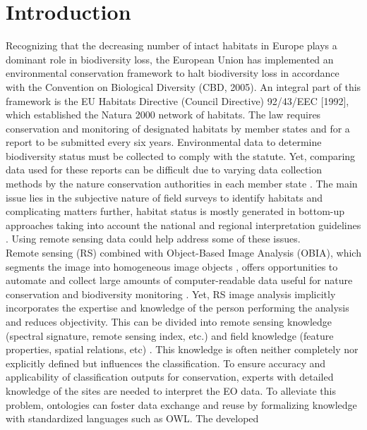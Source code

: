 \documentclass[authoryear, review,12pt,number]{elsarticle}
\begin{document}
\section{Introduction}  %
Recognizing that the decreasing number of
intact habitats in Europe  plays a dominant role in biodiversity loss, the
European Union has implemented an environmental conservation framework to halt
biodiversity loss in accordance with the Convention on Biological Diversity
(CBD, 2005). An integral part of this framework is the EU Habitats Directive
(Council Directive) 92/43/EEC [1992], which established the Natura 2000 network
of habitats. The law requires conservation and monitoring of designated habitats
by member states and for a report to be submitted every six years.
Environmental data to determine biodiversity status must be collected to comply
with the statute. Yet, comparing data used for these reports can be
difficult due to varying data collection methods by the nature conservation
authorities in each member state \citep{INSPIREdataspecs, INSPIRE}.
The main issue lies in the subjective nature of field surveys to identify
habitats \citep{Cherrill1999, Cherrill1999a, Nieland2015} and  %
complicating matters further, habitat status is mostly generated in
bottom-up approaches taking into account the national and regional
interpretation guidelines \citep{INSPIREdataspecs}. Using remote sensing
data could help address some of these issues.
\\
Remote sensing (RS) combined with Object-Based Image Analysis (OBIA), which
segments the image into homogeneous image objects \citep{Blaschke2010}, offers
opportunities to automate and collect large amounts of computer-readable data
useful for nature conservation and biodiversity monitoring \citep{Corbane2015,
VandenBorre2011, Mayer2011}. Yet, RS image analysis implicitly incorporates the
expertise and knowledge of the person performing the analysis and reduces
objectivity. This can be divided into remote sensing knowledge (spectral
signature, remote sensing index, etc.) and field knowledge (feature properties,
spatial relations, etc) \citep{Andres2013a}. This knowledge is often neither
completely nor explicitly defined but influences the classification. To ensure
accuracy and applicability of classification outputs for conservation, experts
with detailed knowledge of the sites are needed to interpret the EO data. To
alleviate this problem, ontologies can foster data exchange and reuse by
formalizing knowledge with standardized languages such as OWL. The developed
\end{document}
